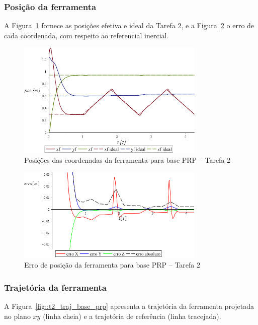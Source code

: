 \subsubsection{Posição da ferramenta}

A Figura~\ref{fig::t2_posf_base_prp} fornece as posições efetiva e ideal da
Tarefa 2, e a Figura~\ref{fig::t2_erroposf_base_prp} o erro de cada
coordenada, com respeito ao referencial inercial.

\begin{figure}[h!]
	\centering 
 	\includegraphics[width=0.80\textwidth]{figs/t2_posf_base_prp}
 	\caption{Posições das coordenadas da ferramenta para base PRP -- Tarefa
 	2}
 	\label{fig::t2_posf_base_prp}
\end{figure}

\begin{figure}[h!]
	\centering 
 	\includegraphics[width=0.80\textwidth]{figs/t2_erroposf_base_prp}
 	\caption{Erro de posição da ferramenta para base PRP -- Tarefa 2}
 	\label{fig::t2_erroposf_base_prp}
\end{figure}


\subsubsection{Trajetória da ferramenta}

A Figura~\ref{fig::t2_traj_base_prp} apresenta a trajetória da ferramenta
projetada no plano $xy$ (linha cheia) e a trajetória de referência (linha
tracejada).

